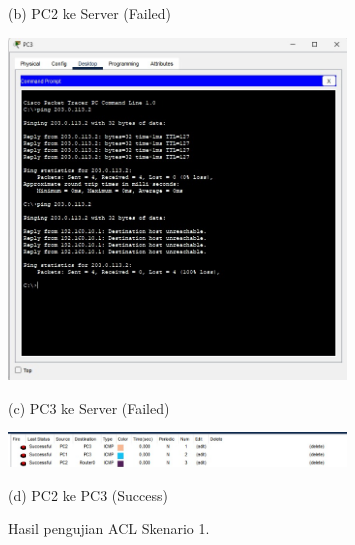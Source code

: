 \begin{enumerate}
\begin{figure}[H]
\begin{minipage}{0.48\textwidth}
            \caption*{(b) PC2 ke Server (Failed)}
        \end{minipage}
        \vspace{1em}
        \begin{minipage}{0.48\textwidth}
            \centering
            \includegraphics[width=0.8\textwidth]{img4/PC3Ping.jpeg}
            \caption*{(c) PC3 ke Server (Failed)}
        \end{minipage}\hfill
        \begin{minipage}{0.48\textwidth}
            \centering
            \includegraphics[width=0.8\textwidth]{img4/PingLan.png}
            \caption*{(d) PC2 ke PC3 (Success)}
        \end{minipage}
        \caption{Hasil pengujian ACL Skenario 1.}
    \end{figure}
\end{enumerate}

